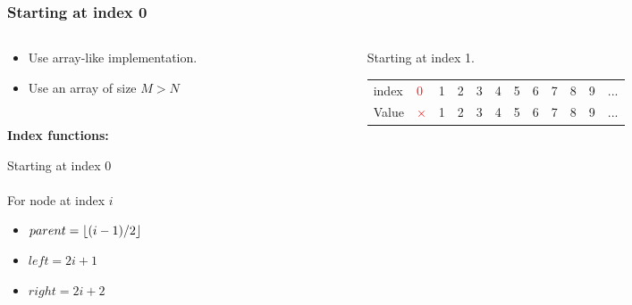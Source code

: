 \documentclass[10pt]{beamer}
\DeclarePairedDelimiter\floor{\lfloor}{\rfloor}
\begin{document}
\begin{frame}[t]\frametitle{Starting at index 0}
	\begin{columns}[T] %
	\begin{column}{.5\linewidth} %
	{\footnotesize
		
		\begin{itemize}
			\item
			Use array-like implementation.

			\item
			Use an array of size \(M > N\)
		\end{itemize}

		\phantom{line}\\
		
		\textbf{Index functions:}
		
		Starting at index 0\\ 
		\phantom{line} \\
		For node at index \(i\)

		\begin{itemize}
			\item
			 \( parent = \floor*{ (i - 1) / 2} \)
			
			\item
			\( left = 2 i + 1 \)
			
			\item
			\( right = 2 i + 2 \)
		\end{itemize}
	} %
	\end{column} %
	\begin{column}{.5\linewidth} %
		\begin{example}
		{\footnotesize
		Starting at index 1.
		} %

		{\scriptsize
			
		} %

		{\tiny 
			\begin{table}[t]
			\setlength{\tabcolsep}{5pt}
			\begin{tabular}
				{|
					p{.3cm} 
					!{\vrule width 1pt}
					*{11}{p{.05cm}|} 
				}
				\hline
				\textcolor{colorIndex}{index}	
				&\textcolor{red}{0}
				&\textcolor{colorIndex}{1}	&\textcolor{colorIndex}{2}	
				&\textcolor{colorIndex}{3}	&\textcolor{colorIndex}{4}	
				&\textcolor{colorIndex}{5}	&\textcolor{colorIndex}{6}	
				&\textcolor{colorIndex}{7}	&\textcolor{colorIndex}{8}	
				&\textcolor{colorIndex}{9}	&\textcolor{colorIndex}{...}\\
				
				
				Value	
				&\textcolor{red}{$\times$}	
				&1	&2	&3	&4	&5	&6	&7	&8	&9	&...\\
				\hline
			\end{tabular}
			\end{table}
		} %
		\end{example}
		\end{column} %
	\end{columns} %
\end{frame}
\end{document}
